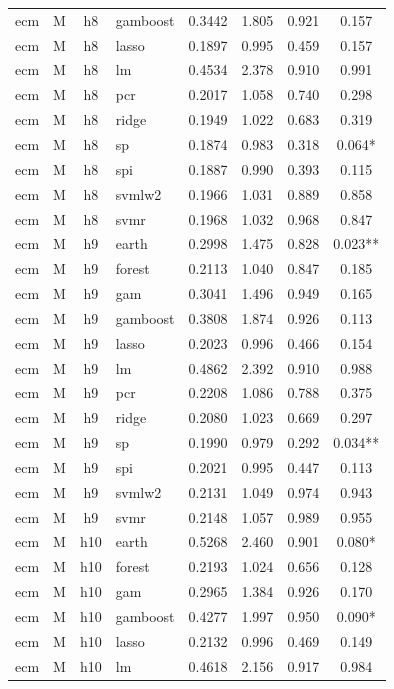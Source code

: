 \begin{ThreePartTable}
\begin{longtable}[t]{llclcccc}
ecm & M & h8 & gamboost & 0.3442 & 1.805 & 0.921 & 0.157\\
ecm & M & h8 & lasso & 0.1897 & 0.995 & 0.459 & 0.157\\
ecm & M & h8 & lm & 0.4534 & 2.378 & 0.910 & 0.991\\
ecm & M & h8 & pcr & 0.2017 & 1.058 & 0.740 & 0.298\\
ecm & M & h8 & ridge & 0.1949 & 1.022 & 0.683 & 0.319\\
ecm & M & h8 & sp & 0.1874 & 0.983 & 0.318 & 0.064*\\
ecm & M & h8 & spi & 0.1887 & 0.990 & 0.393 & 0.115\\
ecm & M & h8 & svmlw2 & 0.1966 & 1.031 & 0.889 & 0.858\\
ecm & M & h8 & svmr & 0.1968 & 1.032 & 0.968 & 0.847\\
\addlinespace
ecm & M & h9 & earth & 0.2998 & 1.475 & 0.828 & 0.023**\\
ecm & M & h9 & forest & 0.2113 & 1.040 & 0.847 & 0.185\\
ecm & M & h9 & gam & 0.3041 & 1.496 & 0.949 & 0.165\\
ecm & M & h9 & gamboost & 0.3808 & 1.874 & 0.926 & 0.113\\
ecm & M & h9 & lasso & 0.2023 & 0.996 & 0.466 & 0.154\\
ecm & M & h9 & lm & 0.4862 & 2.392 & 0.910 & 0.988\\
ecm & M & h9 & pcr & 0.2208 & 1.086 & 0.788 & 0.375\\
ecm & M & h9 & ridge & 0.2080 & 1.023 & 0.669 & 0.297\\
ecm & M & h9 & sp & 0.1990 & 0.979 & 0.292 & 0.034**\\
ecm & M & h9 & spi & 0.2021 & 0.995 & 0.447 & 0.113\\
ecm & M & h9 & svmlw2 & 0.2131 & 1.049 & 0.974 & 0.943\\
ecm & M & h9 & svmr & 0.2148 & 1.057 & 0.989 & 0.955\\
\addlinespace
ecm & M & h10 & earth & 0.5268 & 2.460 & 0.901 & 0.080*\\
ecm & M & h10 & forest & 0.2193 & 1.024 & 0.656 & 0.128\\
ecm & M & h10 & gam & 0.2965 & 1.384 & 0.926 & 0.170\\
ecm & M & h10 & gamboost & 0.4277 & 1.997 & 0.950 & 0.090*\\
ecm & M & h10 & lasso & 0.2132 & 0.996 & 0.469 & 0.149\\
ecm & M & h10 & lm & 0.4618 & 2.156 & 0.917 & 0.984\\

\end{longtable}
\end{ThreePartTable}
